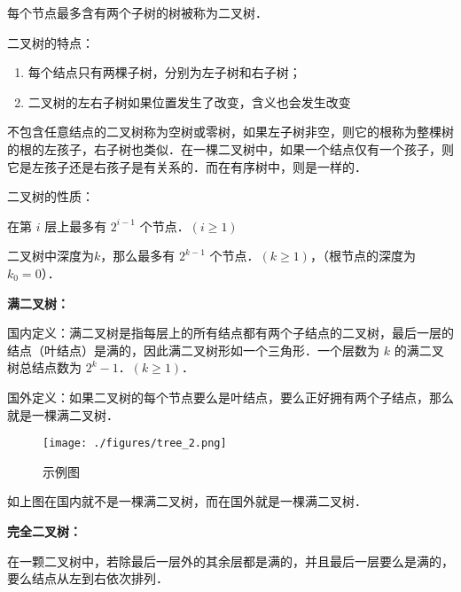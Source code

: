 
每个节点最多含有两个子树的树被称为二叉树．

二叉树的特点：

\begin{enumerate}
\item 每个结点只有两棵子树，分别为左子树和右子树；
\item 二叉树的左右子树如果位置发生了改变，含义也会发生改变
\end{enumerate}

不包含任意结点的二叉树称为空树或零树，如果左子树非空，则它的根称为整棵树的根的左孩子，右子树也类似．在一棵二叉树中，如果一个结点仅有一个孩子，则它是左孩子还是右孩子是有关系的．而在有序树中，则是一样的．

二叉树的性质：

在第 $i$ 层上最多有 $2 ^ {i - 1}$ 个节点．$(i\geq1)$

二叉树中深度为$k$，那么最多有 $2 ^ {k - 1}$ 个节点．$(k\geq1)$，（根节点的深度为 $k_0 = 0$）．

\textbf{满二叉树：}

国内定义：满二叉树是指每层上的所有结点都有两个子结点的二叉树，最后一层的结点（叶结点）是满的，因此满二叉树形如一个三角形．一个层数为 $k$ 的满二叉树总结点数为 $2^k - 1$．$(k\geq1)$．

国外定义：如果二叉树的每个节点要么是叶结点，要么正好拥有两个子结点，那么就是一棵满二叉树．

\begin{figure}[ht]
\centering
\texttt{[image: ./figures/tree\_2.png]}
\caption{示例图} \label{tree_fig2}
\end{figure}

如上图在国内就不是一棵满二叉树，而在国外就是一棵满二叉树．

\textbf{完全二叉树：}

在一颗二叉树中，若除最后一层外的其余层都是满的，并且最后一层要么是满的，要么结点从左到右依次排列．